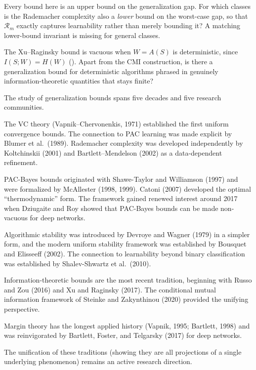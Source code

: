 \begin{openprob}
\label{op:rademacher-lower}
Every bound here is an upper bound on the generalization gap.  For which
classes is the Rademacher complexity also a \emph{lower} bound on the
worst-case gap, so that $\mathcal{R}_m$ exactly captures learnability rather
than merely bounding it?  A matching lower-bound invariant is missing for
general classes.
\end{openprob}

\begin{openprob}
\label{op:info-deterministic}
The Xu--Raginsky bound is vacuous when $W = A(S)$ is deterministic, since
$I(S;W) = H(W)$ ().  Apart from the CMI construction, is there a
generalization bound for deterministic algorithms phrased in genuinely
information-theoretic quantities that stays finite?
\end{openprob}



\begin{historical}
The study of generalization bounds spans five decades and five research
communities.

The VC theory (Vapnik--Chervonenkis, 1971) established the first uniform
convergence bounds.  The connection to PAC learning was made explicit by
Blumer et al.\ (1989).  Rademacher complexity was developed independently
by Koltchinskii (2001) and Bartlett--Mendelson (2002) as a data-dependent
refinement.

PAC-Bayes bounds originated with Shawe-Taylor and Williamson (1997) and
were formalized by McAllester (1998, 1999).  Catoni (2007) developed the
optimal ``thermodynamic'' form.  The framework gained renewed interest
around 2017 when Dziugaite and Roy showed that PAC-Bayes bounds can be
made non-vacuous for deep networks.

Algorithmic stability was introduced by Devroye and Wagner (1979) in a
simpler form, and the modern uniform stability framework was established
by Bousquet and Elisseeff (2002).  The connection to learnability beyond
binary classification was established by Shalev-Shwartz et al.\ (2010).

Information-theoretic bounds are the most recent tradition, beginning
with Russo and Zou (2016) and Xu and Raginsky (2017).  The conditional
mutual information framework of Steinke and Zakynthinou (2020) provided
the unifying perspective.

Margin theory has the longest applied history (Vapnik, 1995; Bartlett,
1998) and was reinvigorated by Bartlett, Foster, and Telgarsky (2017)
for deep networks.

The unification of these traditions (showing they are all projections
of a single underlying phenomenon) remains an active research
direction.
\end{historical}


